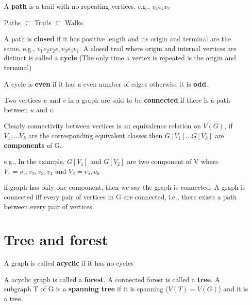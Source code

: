 	 		\begin{definition}[path]
	 			A \textbf{path} is a trail with no repeating vertices. e.g., $v_3e_4v_2$
	 		\end{definition}
	 		
	 		Paths $\subseteq$ Trails $\subseteq$ Walks

	 		\begin{definition}
	 			A path is \textbf{closed} if it has positive length and its origin and terminal are the same. e.g., $v_1e_2v_2e_4v_3e_3v_1$. A closed trail where origin and internal vertices are distinct is called a \textbf{cycle} (The only time a vertex is repeated is the origin and terminal)
	 		\end{definition}
	 		
	 		\begin{definition}
	 			A cycle is \textbf{even} if it has a even number of edges otherwise it is \textbf{odd}.
	 		\end{definition}
	 		
	 		\begin{definition}
	 			Two vertices $u$ and $v$ in a graph are said to be \textbf{connected} if there is a path between $u$ and $v$.
	 		\end{definition}
	 		
	 		\begin{definition}[component]
	 			Clearly connectivity between vertices is an equivalence relation on $V(G)$, if $V_1, ... V_k$ are the corresponding equivalent classes then $G[V_1]...G[V_k]$ are \textbf{components} of G.
	 		\end{definition}
	 		e.g., In the example, $G[V_1]$ and $G[V_2]$  are two component of V where $V_1={v_1, v_2, v_3, v_4}$ and $V_2={v_5, v_6}$

	 		if graph has only one component, then we say the graph is connected. A graph is connected iff every pair of vertices in G are connected, i.e., there exists a path between every pair of vertices.

	 	\section{Tree and forest}
	 		\begin{definition}
	 			A graph is called \textbf{acyclic} if it has no cycles
	 		\end{definition}
			
	 		\begin{definition}
	 			A acyclic graph is called a \textbf{forest}. A connected forest is called a \textbf{tree}. A subgraph T of G is a \textbf{spanning tree} if it is spanning ($V(T)=V(G)$) and it is a tree.
	 		\end{definition}

